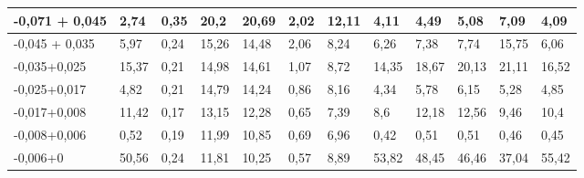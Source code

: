 {\begin{longtable}[c]{|p{}lllllllllll|}
\multicolumn{1}{|l|}{-0,071 + 0,045} & \multicolumn{1}{l|}{2,74} & \multicolumn{1}{l|}{0,35} & \multicolumn{1}{l|}{20,2} & \multicolumn{1}{l|}{20,69} & \multicolumn{1}{l|}{2,02} & \multicolumn{1}{l|}{12,11} & \multicolumn{1}{l|}{4,11} & \multicolumn{1}{l|}{4,49} & \multicolumn{1}{l|}{5,08} & \multicolumn{1}{l|}{7,09} & 4,09 \\ \hline
\multicolumn{1}{|l|}{-0,045 + 0,035} & \multicolumn{1}{l|}{5,97} & \multicolumn{1}{l|}{0,24} & \multicolumn{1}{l|}{15,26} & \multicolumn{1}{l|}{14,48} & \multicolumn{1}{l|}{2,06} & \multicolumn{1}{l|}{8,24} & \multicolumn{1}{l|}{6,26} & \multicolumn{1}{l|}{7,38} & \multicolumn{1}{l|}{7,74} & \multicolumn{1}{l|}{15,75} & 6,06 \\ \hline
\multicolumn{1}{|l|}{-0,035+0,025} & \multicolumn{1}{l|}{15,37} & \multicolumn{1}{l|}{0,21} & \multicolumn{1}{l|}{14,98} & \multicolumn{1}{l|}{14,61} & \multicolumn{1}{l|}{1,07} & \multicolumn{1}{l|}{8,72} & \multicolumn{1}{l|}{14,35} & \multicolumn{1}{l|}{18,67} & \multicolumn{1}{l|}{20,13} & \multicolumn{1}{l|}{21,11} & 16,52 \\ \hline
\multicolumn{1}{|l|}{-0,025+0,017} & \multicolumn{1}{l|}{4,82} & \multicolumn{1}{l|}{0,21} & \multicolumn{1}{l|}{14,79} & \multicolumn{1}{l|}{14,24} & \multicolumn{1}{l|}{0,86} & \multicolumn{1}{l|}{8,16} & \multicolumn{1}{l|}{4,34} & \multicolumn{1}{l|}{5,78} & \multicolumn{1}{l|}{6,15} & \multicolumn{1}{l|}{5,28} & 4,85 \\ \hline
\multicolumn{1}{|l|}{-0,017+0,008} & \multicolumn{1}{l|}{11,42} & \multicolumn{1}{l|}{0,17} & \multicolumn{1}{l|}{13,15} & \multicolumn{1}{l|}{12,28} & \multicolumn{1}{l|}{0,65} & \multicolumn{1}{l|}{7,39} & \multicolumn{1}{l|}{8,6} & \multicolumn{1}{l|}{12,18} & \multicolumn{1}{l|}{12,56} & \multicolumn{1}{l|}{9,46} & 10,4 \\ \hline
\multicolumn{1}{|l|}{-0,008+0,006} & \multicolumn{1}{l|}{0,52} & \multicolumn{1}{l|}{0,19} & \multicolumn{1}{l|}{11,99} & \multicolumn{1}{l|}{10,85} & \multicolumn{1}{l|}{0,69} & \multicolumn{1}{l|}{6,96} & \multicolumn{1}{l|}{0,42} & \multicolumn{1}{l|}{0,51} & \multicolumn{1}{l|}{0,51} & \multicolumn{1}{l|}{0,46} & 0,45 \\ \hline
\multicolumn{1}{|l|}{-0,006+0} & \multicolumn{1}{l|}{50,56} & \multicolumn{1}{l|}{0,24} & \multicolumn{1}{l|}{11,81} & \multicolumn{1}{l|}{10,25} & \multicolumn{1}{l|}{0,57} & \multicolumn{1}{l|}{8,89} & \multicolumn{1}{l|}{53,82} & \multicolumn{1}{l|}{48,45} & \multicolumn{1}{l|}{46,46} & \multicolumn{1}{l|}{37,04} & 55,42 \\ \hline

\end{longtable}}
